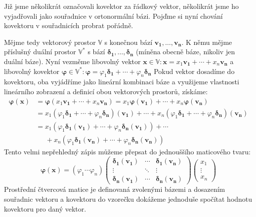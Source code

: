 \documentclass[a5paper,12pt]{amsbook}
\theoremstyle{definition}
\newcommand{\myvec}[1]{\bm{#1}}
\newcommand{\myspace}[1]{\mathbb{#1}}
\newcommand{\mydual}[1]{\myspace{#1^{*}}}
\begin{document}
\noindent
Již jsme několikrát označovali kovektor za řádkový vektor, několikrát jsme ho vyjadřovali jako
souřadnice v ortonormální bázi. Pojďme si nyní chování kovektoru v souřadnicích probrat pořádně.

Mějme tedy vektorový prostor $\myspace{V}$ s konečnou bází ${\myvec{v_1}, \hdots , \myvec{v_n}}$.
K němu mějme příslušný duální prostor $\mydual{V}$ s bází
${\myvec{\delta_1}, \hdots , \myvec{\delta_n}}$ (míněna obecně báze, nikoliv jen duální báze).
Nyní vezměme libovolný vektor
$\myvec{x}\in\myspace{V}: \myvec{x} = x_1\myvec{v_1} + \cdots + x_n\myvec{v_n}$
a libovolný kovektor
$\myvec{\varphi}\in\mydual{V}: \myvec{\varphi} = \varphi_1\myvec{\delta_1} + \cdots + \varphi_n\myvec{\delta_n}$
Pokud vektor dosadíme do kovektoru, oba vyjádříme jako lineární kombinaci báze a využijeme
vlastnosti lineárního zobrazení a definicí obou vektorových prostorů, získáme:
\begin{equation*}
\begin{split}
\myvec{\varphi}(\myvec{x}) &= \myvec{\varphi}(x_1\myvec{v_1} + \cdots + x_n\myvec{v_n})
     = x_1\myvec{\varphi}(\myvec{v_1}) + \cdots + x_n\myvec{\varphi}(\myvec{v_n}) \\
    &= x_1(\varphi_1\myvec{\delta_1} + \cdots + \varphi_n\myvec{\delta_n})(\myvec{v_1}) + \cdots
       + x_n(\varphi_1\myvec{\delta_1} + \cdots + \varphi_n\myvec{\delta_n})(\myvec{v_n}) \\
    &= x_1(\varphi_1\myvec{\delta_1}(\myvec{v_1}) + \cdots + \varphi_n\myvec{\delta_n}(\myvec{v_1})) 
    + \cdots \\
    & \;\;\;\;\; + x_n(\varphi_1\myvec{\delta_1}(\myvec{v_n}) + \cdots + \varphi_n\myvec{\delta_n}(\myvec{v_n}))
\end{split}
\end{equation*}
Tento velmi nepřehledný zápis můžeme přepsat do jednouššího maticového tvaru:
\begin{equation*}
\myvec{\varphi}(\myvec{x}) = \left(\varphi_1 \cdots \varphi_n\right)
\left(\begin{array}{ccc}
\myvec{\delta_1}(\myvec{v_1}) & \cdots & \myvec{\delta_1}(\myvec{v_n}) \\
\vdots & \ddots & \vdots \\
\myvec{\delta_n}(\myvec{v_1}) & \cdots & \myvec{\delta_n}(\myvec{v_n})
\end{array}\right)\left(\begin{array}{c}x_1 \\ \vdots \\ x_n\end{array}\right)
\end{equation*}
Prostřední čtvercová matice je definovaná zvolenými bázemi a dosazením souřadnic
vektoru a kovektoru do vzorečku dokážeme jednoduše spočítat hodnotu kovektoru
pro daný vektor.
\end{document}
